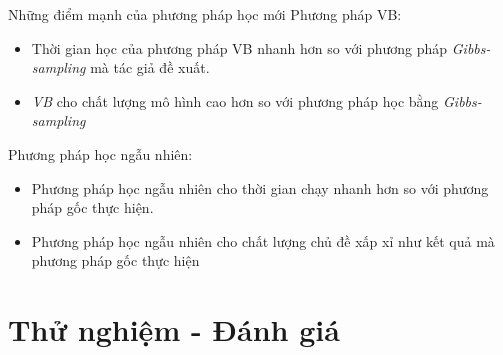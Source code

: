 \documentclass[pdf]{beamer}
\begin{document}
\begin{frame}{Những điểm mạnh của phương pháp học mới}
Phương pháp VB:
	\begin{itemize}
		\item Thời gian học của phương pháp VB nhanh hơn so với phương pháp \textit{Gibbs-sampling} mà tác giả đề xuất.
		\item \textit{VB} cho chất lượng mô hình cao hơn so với phương pháp học bằng \textit{Gibbs-sampling}
	\end{itemize}
Phương pháp học ngẫu nhiên:
	\begin{itemize}
		\item Phương pháp học ngẫu nhiên cho thời gian chạy nhanh hơn so với phương pháp gốc thực hiện.
		\item Phương pháp học ngẫu nhiên cho chất lượng chủ đề xấp xỉ như kết quả mà phương pháp gốc thực hiện
	\end{itemize}
\end{frame}

\section{Thử nghiệm - Đánh giá}
\end{document}
